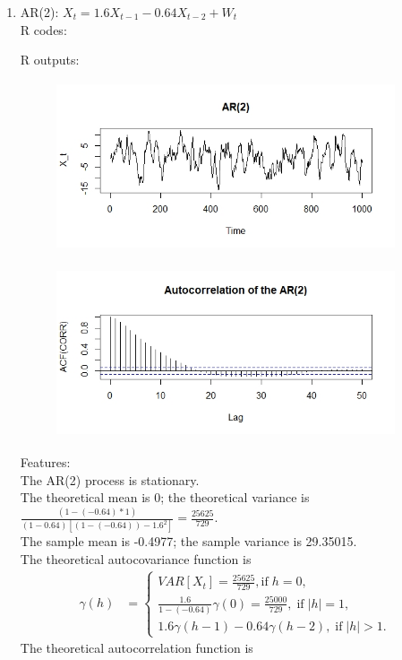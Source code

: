 \documentclass[10pt]{article}
\begin{document}
\begin{enumerate}[1)]
\item
AR(2): $X_t=1.6X_{t-1}-0.64X_{t-2}+W_t$\\
R codes:

R outputs:

\begin{figure}[H]
  \centering
  \includegraphics[width=10cm,height=5cm]{p32a.jpeg} %
\end{figure}
\begin{figure}[H]
  \centering
  \includegraphics[width=10cm,height=5cm]{p32b.jpeg}
\end{figure}
Features:\\
The AR(2) process is stationary.\\
The theoretical mean is 0; the theoretical variance is $\frac{(1-(-0.64)*1)}{(1-0.64)[(1-(-0.64))-1.6^2]}=\frac{25625}{729}$.\\
The sample mean is -0.4977; the sample variance is 29.35015.\\
The theoretical autocovariance function is
\begin{align*}
\gamma(h)&=\left\{\begin{array}{ll}VAR[X_t]=\frac{25625}{729},\textrm{if}\;h=0,\\
\frac{1.6}{1-(-0.64)}\gamma(0)=\frac{25000}{729},\;\textrm{if}\;|h|=1,\\
1.6\gamma(h-1)-0.64\gamma(h-2),\;\textrm{if}\;|h|>1.\end{array}\right.
\end{align*}
The theoretical autocorrelation function is

\end{enumerate}
\end{document}
